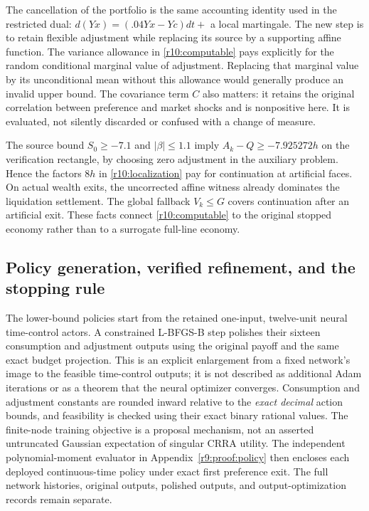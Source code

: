 The cancellation of the portfolio is the same accounting identity used in the restricted dual: $d(Yx)=(.04Yx-Yc)dt+$ a local martingale. The new step is to retain flexible adjustment while replacing its source by a supporting affine function. The variance allowance in \eqref{r10:computable} pays explicitly for the random conditional marginal value of adjustment. Replacing that marginal value by its unconditional mean without this allowance would generally produce an invalid upper bound. The covariance term $C$ also matters: it retains the original correlation between preference and market shocks and is nonpositive here. It is evaluated, not silently discarded or confused with a change of measure.

The source bound $S_0\geq-7.1$ and $|\beta|\leq1.1$ imply $A_k-Q\geq-7.925272h$ on the verification rectangle, by choosing zero adjustment in the auxiliary problem. Hence the factors $8h$ in \eqref{r10:localization} pay for continuation at artificial faces. On actual wealth exits, the uncorrected affine witness already dominates the liquidation settlement. The global fallback $V_k\leq G$ covers continuation after an artificial exit. These facts connect \eqref{r10:computable} to the original stopped economy rather than to a surrogate full-line economy.

\subsection{Policy generation, verified refinement, and the stopping rule}\label{r10:algorithm}
The lower-bound policies start from the retained one-input, twelve-unit neural time-control actors. A constrained L-BFGS-B step polishes their sixteen consumption and adjustment outputs using the original payoff and the same exact budget projection. This is an explicit enlargement from a fixed network's image to the feasible time-control outputs; it is not described as additional Adam iterations or as a theorem that the neural optimizer converges. Consumption and adjustment constants are rounded inward relative to the \emph{exact decimal} action bounds, and feasibility is checked using their exact binary rational values. The finite-node training objective is a proposal mechanism, not an asserted untruncated Gaussian expectation of singular CRRA utility. The independent polynomial-moment evaluator in Appendix~\ref{r9:proof:policy} then encloses each deployed continuous-time policy under exact first preference exit. The full network histories, original outputs, polished outputs, and output-optimization records remain separate.

